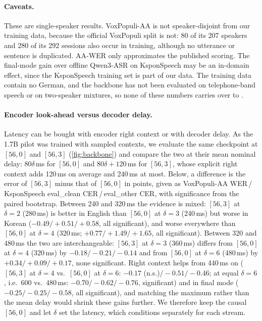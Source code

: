 \paragraph{Caveats.}
These are single-speaker results. VoxPopuli-AA is not speaker-disjoint from our training data, because the official VoxPopuli split is not: 80 of its 207 speakers and 280 of its 292 sessions also occur in training, although no utterance or sentence is duplicated. AA-WER only approximates the published scoring. The final-mode gain over offline Qwen3-ASR on KsponSpeech may be an in-domain effect, since the KsponSpeech training set is part of our data. The training data contain no German, and the backbone has not been evaluated on telephone-band \taxi speech or on two-speaker mixtures, so none of these numbers carries over to \task.

\paragraph{Encoder look-ahead versus decoder delay.}
Latency can be bought with encoder right context or with decoder delay. As the 1.7B pilot was trained with sampled contexts, we evaluate the same checkpoint at $[56,0]$ and $[56,3]$ (\cref{fig:backbone}) and compare the two at their mean nominal delay: $80\delta$\,ms for $[56,0]$ and $80\delta+120$\,ms for $[56,3]$, whose explicit right context adds 120\,ms on average and 240\,ms at most. Below, a difference is the error of $[56,3]$ minus that of $[56,0]$ in points, given as VoxPopuli-AA WER\,/\,KsponSpeech eval\_clean CER\,/\,eval\_other CER, with significance from the paired bootstrap. Between 240 and 320\,ms the evidence is mixed: $[56,3]$ at $\delta=2$ (280\,ms) is better in English than $[56,0]$ at $\delta=3$ (240\,ms) but worse in Korean ($-0.49/+0.51/+0.58$, all significant), and worse everywhere than $[56,0]$ at $\delta=4$ (320\,ms; $+0.77/+1.49/+1.65$, all significant). Between 320 and 480\,ms the two are interchangeable: $[56,3]$ at $\delta=3$ (360\,ms) differs from $[56,0]$ at $\delta=4$ (320\,ms) by $-0.18/-0.21/-0.14$ and from $[56,0]$ at $\delta=6$ (480\,ms) by $+0.34/+0.09/+0.17$, none significant. Right context helps from 440\,ms on ($[56,3]$ at $\delta=4$ vs.\ $[56,0]$ at $\delta=6$: $-0.17$ (n.s.)$/-0.51/-0.46$; at equal $\delta=6$, i.e.\ 600 vs.\ 480\,ms: $-0.70/-0.62/-0.76$, significant) and in final mode ($-0.25/-0.25/-0.58$, all significant), and matching the maximum rather than the mean delay would shrink these gains further. We therefore keep the causal $[56,0]$ and let $\delta$ set the latency, which \model conditions separately for each stream.

